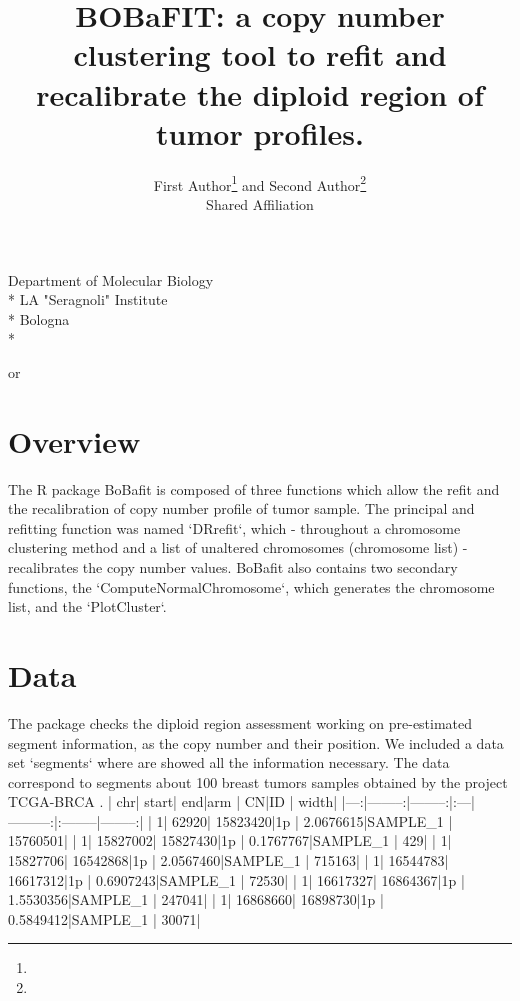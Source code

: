 \documentclass{article}
\title{\bf BOBaFIT: a copy number clustering tool to refit and recalibrate the diploid region of tumor profiles.}
\author{
First Author\thanks{\email{first@author.com}} and
Second Author\thanks{\email{second@author.com}}\\
Shared Affiliation
}
\begin{document}


\maketitle

\begin{center}
  Department of Molecular Biology\\*
  LA "Seragnoli" Institute \\*
  Bologna \\*
\end{center}

\begin{center}
   or 
\end{center}

\tableofcontents


\section{Overview}
The R package BoBafit is composed of three functions which allow the refit and the recalibration of copy number profile of tumor sample. The principal and refitting function was named `DRrefit`, which - throughout a chromosome clustering method and a list of unaltered chromosomes (chromosome list) - recalibrates the copy number values. BoBafit also contains two secondary functions, the `ComputeNormalChromosome`, which generates the chromosome list, and the `PlotCluster`.

\section{Data}
The package checks the diploid region assessment working on pre-estimated segment information, as the copy number and their position. We included a data set `segments` where are showed all the information necessary. The data correspond to segments about 100 breast tumors samples obtained by the project TCGA-BRCA \cite{10.5114/wo.2014.47136}.
| chr|    start|      end|arm |        CN|ID       |    width|
|---:|--------:|--------:|:---|---------:|:--------|--------:|
|   1|    62920| 15823420|1p  | 2.0676615|SAMPLE_1 | 15760501|
|   1| 15827002| 15827430|1p  | 0.1767767|SAMPLE_1 |      429|
|   1| 15827706| 16542868|1p  | 2.0567460|SAMPLE_1 |   715163|
|   1| 16544783| 16617312|1p  | 0.6907243|SAMPLE_1 |    72530|
|   1| 16617327| 16864367|1p  | 1.5530356|SAMPLE_1 |   247041|
|   1| 16868660| 16898730|1p  | 0.5849412|SAMPLE_1 |    30071|
\end{document}

